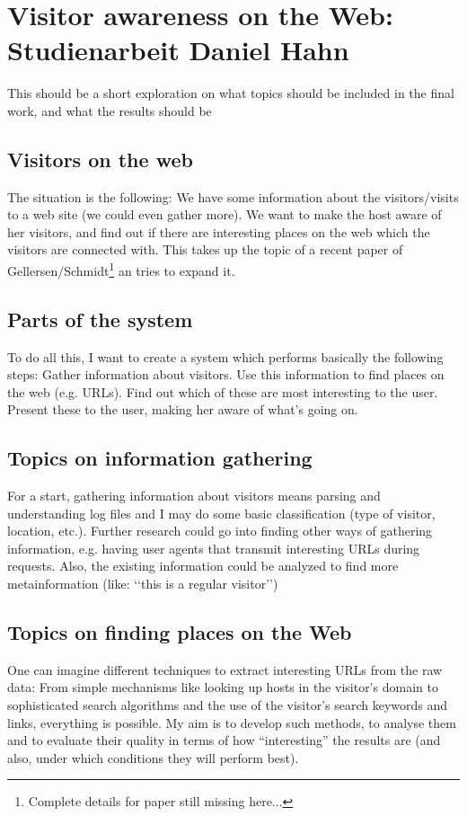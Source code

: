 \documentclass[a4paper]{danarticle}
\begin{document}
  \section{Visitor awareness on the Web: Studienarbeit Daniel Hahn}
    This should be a short exploration on what topics should be included in the
    final work, and what the results should be
    \subsection{Visitors on the web}
      The situation is the following: We have some information about the
      visitors/visits to a web site (we could even gather more). We want to make
      the host aware of her visitors, and find out if there are interesting
      places on the web which the visitors are connected with. This takes up the
      topic of a recent paper of Gellersen/Schmidt\footnote{Complete details
      for paper still missing here...} an tries to expand it.
    \subsection{Parts of the system}
      To do all this, I want to create a system which performs basically the
      following steps: Gather information about visitors. Use this information
      to find places on the web (e.g. URLs). Find out which of these are most
      interesting to the user. Present these to the user, making her aware of
      what's going on.
      \subsection{Topics on information gathering}
        For a start, gathering information about visitors means parsing and
	understanding log files and I may do some basic classification (type of
	visitor, location, etc.). Further research could go into finding other
	ways of gathering information, e.g. having user agents that
	transmit interesting URLs during requests. Also, the existing
	information could be analyzed to find more metainformation (like: \lq\lq this
	is a regular visitor\rq\rq)
      \subsection{Topics on finding places on the Web}
        One can imagine different techniques to extract interesting URLs from
	the raw data: From simple mechanisms like looking up hosts in the
	visitor's domain to sophisticated search algorithms and the use of the
	visitor's search keywords and links, everything is possible.
	My aim is to develop such methods, to analyse them and to evaluate their
	quality in terms of how "`interesting"' the results are (and also, under
	which conditions they will perform best).
\end{document}
